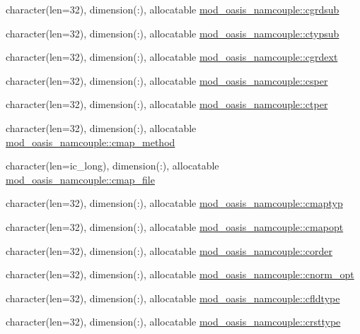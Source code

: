 \begin{DoxyCompactItemize}
character(len=32), dimension(\+:), allocatable \hyperlink{namespacemod__oasis__namcouple_aeadda41d70a777c38f17d845dd429385}{mod\+\_\+oasis\+\_\+namcouple\+::cgrdsub}
\item 
character(len=32), dimension(\+:), allocatable \hyperlink{namespacemod__oasis__namcouple_aa82cea995f7a2c9fd7bfd3703a4593d1}{mod\+\_\+oasis\+\_\+namcouple\+::ctypsub}
\item 
character(len=32), dimension(\+:), allocatable \hyperlink{namespacemod__oasis__namcouple_aab6ce52f64264c8a693b8c4ad24b04cb}{mod\+\_\+oasis\+\_\+namcouple\+::cgrdext}
\item 
character(len=32), dimension(\+:), allocatable \hyperlink{namespacemod__oasis__namcouple_ab91b4542e45eb52edda3b841dcfba553}{mod\+\_\+oasis\+\_\+namcouple\+::csper}
\item 
character(len=32), dimension(\+:), allocatable \hyperlink{namespacemod__oasis__namcouple_a48b8ec939d711809229e738e68efe6b4}{mod\+\_\+oasis\+\_\+namcouple\+::ctper}
\item 
character(len=32), dimension(\+:), allocatable \hyperlink{namespacemod__oasis__namcouple_aa5f62496787c727e9704d243a700e19d}{mod\+\_\+oasis\+\_\+namcouple\+::cmap\+\_\+method}
\item 
character(len=ic\+\_\+long), dimension(\+:), allocatable \hyperlink{namespacemod__oasis__namcouple_a6dbd7bccbfa28b209a4bc58131f8cf11}{mod\+\_\+oasis\+\_\+namcouple\+::cmap\+\_\+file}
\item 
character(len=32), dimension(\+:), allocatable \hyperlink{namespacemod__oasis__namcouple_a3aaa6f326df10eb6e4417ad72e436b41}{mod\+\_\+oasis\+\_\+namcouple\+::cmaptyp}
\item 
character(len=32), dimension(\+:), allocatable \hyperlink{namespacemod__oasis__namcouple_a15cc0b3e86b5e594e1440154d1860f0c}{mod\+\_\+oasis\+\_\+namcouple\+::cmapopt}
\item 
character(len=32), dimension(\+:), allocatable \hyperlink{namespacemod__oasis__namcouple_a7c8548e08b7939c8c13977aba65e8ac9}{mod\+\_\+oasis\+\_\+namcouple\+::corder}
\item 
character(len=32), dimension(\+:), allocatable \hyperlink{namespacemod__oasis__namcouple_a5fdd72f253cfedfec2f198776442d132}{mod\+\_\+oasis\+\_\+namcouple\+::cnorm\+\_\+opt}
\item 
character(len=32), dimension(\+:), allocatable \hyperlink{namespacemod__oasis__namcouple_a069dc714cb69e8ddb649f1d9eb8c7454}{mod\+\_\+oasis\+\_\+namcouple\+::cfldtype}
\item 
character(len=32), dimension(\+:), allocatable \hyperlink{namespacemod__oasis__namcouple_a26bf14d9f10eaecc716179874bef22e3}{mod\+\_\+oasis\+\_\+namcouple\+::crsttype}

\end{DoxyCompactItemize}
